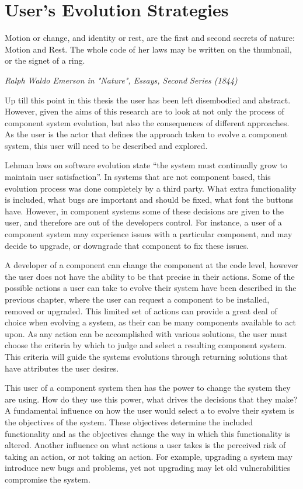 \chapter{User's Evolution Strategies}
\label{strategies}
\epigraph{Motion or change, and identity or rest, are the first and second secrets of nature: Motion and Rest. 
The whole code of her laws may be written on the thumbnail, or the signet of a ring.}
{\textit{Ralph Waldo Emerson in "Nature", Essays, Second Series (1844)}}

Up till this point in this thesis the user has been left disembodied and abstract.
However, given the aims of this research are to look at not only the process of component system evolution, but also the consequences of different approaches.
As the user is the actor that defines the approach taken to evolve a component system, this user will need to be described and explored.

Lehman laws on software evolution state ``the system must continually grow to maintain user satisfaction''.
In systems that are not component based, this evolution process was done completely by a third party.
What extra functionality is included, what bugs are important and should be fixed, what font the buttons have. 
However, in component systems some of these decisions are given to the user, and therefore are out of the developers control.
For instance, a user of a component system may experience issues with a particular component, 
and may decide to upgrade, or downgrade that component to fix these issues.

A developer of a component can change the component at the code level, however the user does not have the ability to be that precise in their actions.
Some of the possible actions a user can take to evolve their system have been described in the previous chapter,
where the user can request a component to be installed, removed or upgraded.
This limited set of actions can provide a great deal of choice when evolving a system, as their can be many components available to act upon.
As any action can be accomplished with various solutions, the user must choose the criteria by which to judge and select a resulting component system.
This criteria will guide the systems evolutions through returning solutions that have attributes the user desires.

This user of a component system then has the power to change the system they are using.
How do they use this power, what drives the decisions that they make?
A fundamental influence on how the user would select a to evolve their system is the objectives of the system.
These objectives determine the included functionality and as the objectives change the way in which this functionality is altered.  
Another influence on what actions a user takes is the perceived risk of taking an action, or not taking an action.
For example, upgrading a system may introduce new bugs and problems, yet not upgrading may let old vulnerabilities compromise the system.

